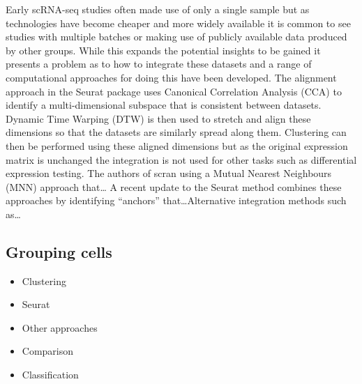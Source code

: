 \documentclass[11pt,a4paper,titlepage,twoside,openright]{style/unimelbthesis}
\theoremstyle{definition}
\theoremstyle{definition}
\theoremstyle{definition}
\theoremstyle{remark}
\begin{document}
\begin{mainmatter}
Early scRNA-seq studies often made use of only a single sample but as technologies have become cheaper and more widely available it is common to see studies with multiple batches or making use of publicly available data produced by other groups. While this expands the potential insights to be gained it presents a problem as to how to integrate these datasets and a range of computational approaches for doing this have been developed. The alignment approach in the Seurat package uses Canonical Correlation Analysis (CCA) to identify a multi-dimensional subspace that is consistent between datasets. Dynamic Time Warping (DTW) is then used to stretch and align these dimensions so that the datasets are similarly spread along them. Clustering can then be performed using these aligned dimensions but as the original expression matrix is unchanged the integration is not used for other tasks such as differential expression testing. The authors of scran using a Mutual Nearest Neighbours (MNN) approach that\ldots{} A recent update to the Seurat method combines these approaches by identifying ``anchors'' that\ldots{}Alternative integration methods such as\ldots{}

\hypertarget{grouping-cells}{%
\subsection{Grouping cells}\label{grouping-cells}}

\begin{itemize}
\tightlist
\item
  Clustering
\item
  Seurat
\item
  Other approaches
\item
  Comparison
\item
  Classification
\end{itemize}


\end{mainmatter}
\end{document}
